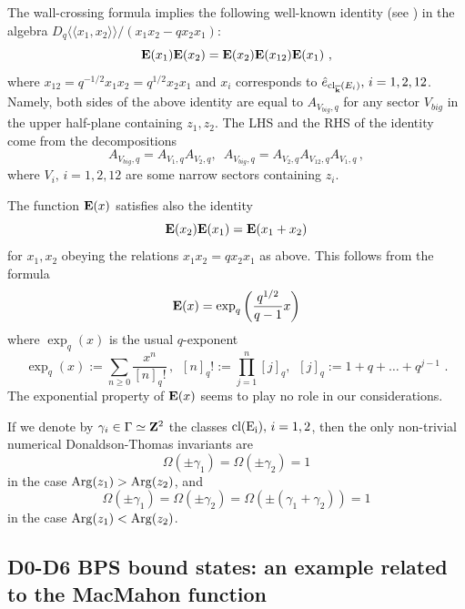 \documentclass[12pt]{article}
\begin{document}
The wall-crossing formula implies the following well-known 
identity (see \cite{FK}) in the algebra $D_q\langle\langle x_1,x_2\rangle\rangle/(x_1x_2-q x_2x_1)$:
$${\bf E}(x_1){\bf E}(x_2)={\bf E}(x_2){\bf E}(x_{12}){\bf E}(x_1)\,\,,$$
where $x_{12}=q^{-1/2}x_1x_2=q^{1/2}x_2x_1$ and $x_i$ corresponds to $\hat{e}_{\operatorname{cl}_{\overline{\bf k}}(E_i)},\, i=1,2,12$.
  Namely, both sides of the above identity are equal  to $A_{V_{big},q}$ for any sector $V_{big}$ in the upper half-plane containing $z_1,z_2$.
The LHS and the RHS of the identity come from the decompositions 
$$A_{V_{big},q}=A_{V_1,q} A_{V_2,q},\,\,\,A_{V_{big},q}=A_{V_2,q}A_{V_{12},q}A_{V_1,q}\,,$$
where $V_i,\,i=1,2,12$ are some narrow sectors containing $z_i$.


\begin{rmk} The function ${\bf E}(x)$ satisfies also the identity
$${\bf E}(x_2){\bf E}(x_1)={\bf E}(x_1+x_2)$$
for $x_1,x_2$ obeying the relations $x_1x_2=q x_2x_1$ as above. This follows from the formula
$${\bf E}(x)=\exp_q \left( \frac{q^{1/2}}{q-1} x \right)$$
where $\exp_q(x)$ is the usual $q$-exponent
$$\exp_q(x):=\sum_{n\geqslant 0}\frac{x^n}{[n]_q !}\,,\,\,\,[n]_q!:=\prod_{j=1}^n[j]_q,\,\,\,[j]_q:=1+q+\dots+q^{j-1}\,\,.$$
The exponential property of ${\bf E}(x)$ seems to play no role in our considerations.
\end{rmk}



If we denote by $\gamma_i \in \Gamma\simeq {\bf Z}^2$ the classes $\operatorname{cl(E_i)}, \, i=1,2$, then the only 
non-trivial numerical Donaldson-Thomas invariants are
$$\Omega(\pm \gamma_1)=\Omega(\pm \gamma_2)=1$$
in the case $\operatorname{Arg}(z_1)>\operatorname{Arg}(z_2)$, and 
  $$\Omega(\pm \gamma_1)=\Omega(\pm \gamma_2)=\Omega(\pm (\gamma_1+\gamma_2))=1$$
in the case $\operatorname{Arg}(z_1)<\operatorname{Arg}(z_2)$.
























\subsection{D0-D6 BPS bound states: an example related to the MacMahon function}
\end{document}
